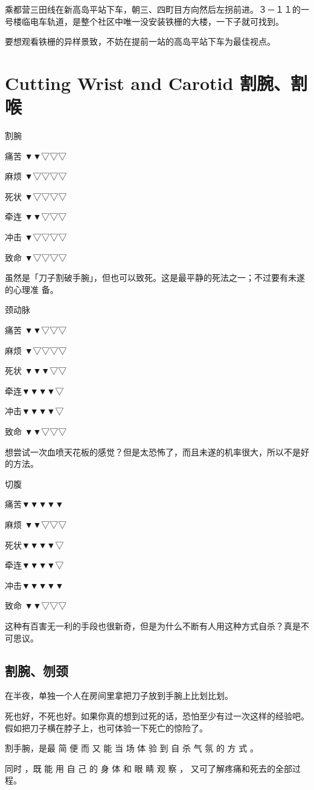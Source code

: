 \documentclass[UTF8]{ctexart}
\begin{document}
乘都营三田线在新高岛平站下车，朝三、四町目方向然后左拐前进。３－１１的一号楼临电车轨道，是整个社区中唯一没安装铁栅的大楼，一下子就可找到。

要想观看铁栅的异样景致，不妨在提前一站的高岛平站下车为最佳视点。

\section{Cutting Wrist and Carotid 割腕、割喉}

割腕

痛苦 ▼▼▽▽▽

麻烦 ▼▽▽▽▽

死状 ▼▽▽▽▽

牵连 ▼▼▽▽▽

冲击 ▼▽▽▽▽

致命 ▼▽▽▽▽

虽然是「刀子割破手腕」，但也可以致死。这是最平静的死法之一；不过要有未遂的心理准
备。

颈动脉

痛苦 ▼▼▽▽▽

麻烦 ▼▽▽▽▽

死状 ▼▼▼▽▽

牵连▼▼▼▼▽

冲击▼▼▼▼▽

致命 ▼▼▽▽▽

想尝试一次血喷天花板的感觉？但是太恐怖了，而且未遂的机率很大，所以不是好的方法。

切腹

痛苦▼▼▼▼▼

麻烦 ▼▼▽▽▽

死状▼▼▼▼▽

牵连▼▼▼▼▽

冲击▼▼▼▼▼

致命 ▼▼▽▽▽

这种有百害无一利的手段也很新奇，但是为什么不断有人用这种方式自杀？真是不可思议。

\subsection*{割腕、刎颈}

在半夜，单独一个人在房间里拿把刀子放到手腕上比划比划。

死也好，不死也好。如果你真的想到过死的话，恐怕至少有过一次这样的经验吧。假如把刀子横在脖子上，也可体验一下死亡的惊险了。

割手腕，是最 简 便 而 又 能 当 场 体 验 到 自 杀 气 氛 的 方 式 。

同时 ，既 能 用 自 己 的 身 体 和 眼 睛 观 察 ， 又可了解疼痛和死去的全部过程。
\end{document}
